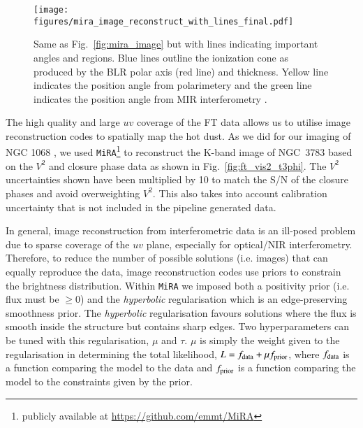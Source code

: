 \documentclass[longauth,]{aa}
\begin{document}
\begin{figure}
\centering
\texttt{[image: figures/mira\_image\_reconstruct\_with\_lines\_final.pdf]}
\caption{Same as Fig.~\ref{fig:mira_image} but with lines indicating important angles and regions. Blue lines outline the ionization cone as produced by the BLR polar axis (red line) and thickness. Yellow line indicates the position angle from polarimetery \citep{lira20} and the green line indicates the position angle from MIR interferometry \citep{Honig:2013qy}.}
\label{fig:mira_image_lines}
\end{figure}


The high quality and large $uv$ coverage of the FT data allows us to utilise image reconstruction codes to spatially map the hot dust. As we did for our imaging of NGC 1068 \citep{Gravity-Collaboration:2020aa}, we used \texttt{MiRA}\footnote{publicly available at \url{https://github.com/emmt/MiRA}} \citep[Multi-aperture Image Reconstruction Algorithm][]{Thiebaut:2008aa} to reconstruct the K-band image of NGC~3783 based on the $V^{2}$ and closure phase data as shown in Fig.~\ref{fig:ft_vis2_t3phi}. The $V^{2}$ uncertainties shown have been multiplied by 10 to match the S/N of the closure phases and avoid overweighting $V^2$. This also takes into account calibration uncertainty that is not included in the pipeline generated data.

In general, image reconstruction from interferometric data is an ill-posed problem due to sparse coverage of the $uv$ plane, especially for optical/NIR interferometry. Therefore, to reduce the number of possible solutions (i.e. images) that can equally reproduce the data, image reconstruction codes use priors to constrain the brightness distribution. Within \texttt{MiRA} we imposed both a positivity prior (i.e. flux must be $\geq0$) and the \textit{hyperbolic} regularisation which is an edge-preserving smoothness prior. The \textit{hyperbolic} regularisation favours solutions where the flux is smooth inside the structure but contains sharp edges. Two hyperparameters can be tuned with this regularisation, $\mu$ and $\tau$. $\mu$ is simply the weight given to the regularisation in determining the total likelihood, $L = f_{\rm data} + \mu f_{\rm prior}$, where $f_{\rm data}$ is a function comparing the model to the data and $f_{\rm prior}$ is a function comparing the model to the constraints given by the prior.
\end{document}

